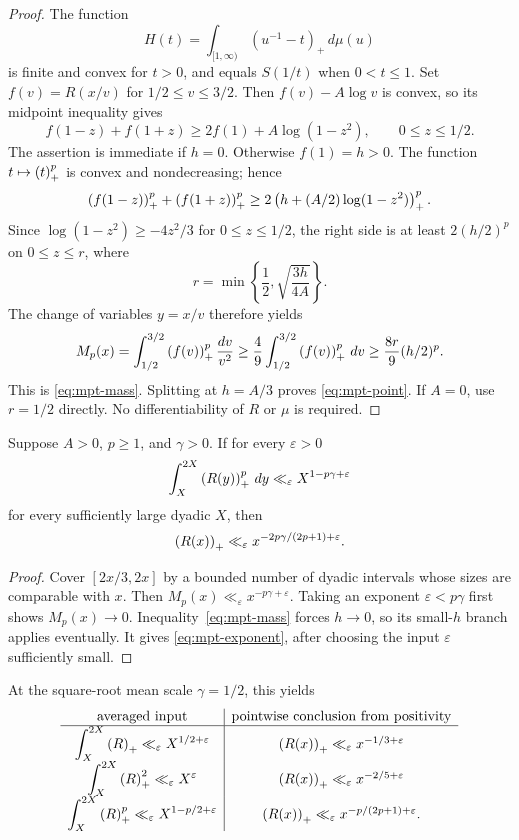 \begin{proof}
The function
\[
 H(t)=\int_{[1,\infty)}(u^{-1}-t)_+\,d\mu(u)
\]
is finite and convex for $t>0$, and equals $S(1/t)$ when
$0<t\le1$. Set $f(v)=R(x/v)$ for
$1/2\le v\le3/2$. Then $f(v)-A\log v$ is convex, so its
midpoint inequality gives
\begin{equation}\label{eq:mpt-midpoint}
 f(1-z)+f(1+z)\ge2f(1)+A\log(1-z^2),
 \qquad 0\le z\le1/2.
\end{equation}
The assertion is immediate if $h=0$. Otherwise $f(1)=h>0$.
The function $t\mapsto\left(t\right)_{+}^p$ is convex and nondecreasing; hence
\[
 \left(f(1-z)\right)_{+}^p+\left(f(1+z)\right)_{+}^p
 \ge2\left(h+(A/2)\log(1-z^2)\right)_{+}^p.
\]
Since $\log(1-z^2)\ge-4z^2/3$ for $0\le z\le1/2$, the right
side is at least $2(h/2)^p$ on $0\le z\le r$, where
\[
 r=\min\left\{\frac12,\sqrt{\frac{3h}{4A}}\right\}.
\]
The change of variables $y=x/v$ therefore yields
\[
 M_p(x)=\int_{1/2}^{3/2}\left(f(v)\right)_{+}^p\frac{dv}{v^2}
 \ge\frac49\int_{1/2}^{3/2}\left(f(v)\right)_{+}^p\,dv
 \ge\frac{8r}{9}(h/2)^p.
\]
This is \eqref{eq:mpt-mass}. Splitting at $h=A/3$ proves
\eqref{eq:mpt-point}. If $A=0$, use $r=1/2$ directly.
No differentiability of $R$ or $\mu$ is required.
\end{proof}

\begin{corollary}
\label{cor:mpt-exponent}
Suppose $A>0$, $p\ge1$, and $\gamma>0$. If for every $\varepsilon>0$
\begin{equation}\label{eq:mpt-dyadic}
 \int_X^{2X}\left(R(y)\right)_{+}^p\,dy
 \ll_\varepsilon X^{1-p\gamma+\varepsilon}
\end{equation}
for every sufficiently large dyadic $X$, then
\begin{equation}\label{eq:mpt-exponent}
 \left(R(x)\right)_{+}\ll_\varepsilon
 x^{-2p\gamma/(2p+1)+\varepsilon}.
\end{equation}
\end{corollary}

\begin{proof}
Cover $[2x/3,2x]$ by a bounded number of dyadic intervals whose sizes
are comparable with $x$. Then
$M_p(x)\ll_\varepsilon x^{-p\gamma+\varepsilon}$.
Taking an exponent $\varepsilon<p\gamma$ first shows $M_p(x)\to0$.
Inequality~\eqref{eq:mpt-mass} forces $h\to0$, so its small-$h$
branch applies eventually. It gives \eqref{eq:mpt-exponent}, after
choosing the input $\varepsilon$ sufficiently small.
\end{proof}

At the square-root mean scale $\gamma=1/2$, this yields
\[
\begin{array}{c|c}
\text{averaged input}&\text{pointwise conclusion from positivity}\\ \hline
\displaystyle\int_X^{2X}\left(R\right)_{+}\ll_\varepsilon X^{1/2+\varepsilon}
 &\left(R(x)\right)_{+}\ll_\varepsilon x^{-1/3+\varepsilon}\\[2mm]
\displaystyle\int_X^{2X}\left(R\right)_{+}^2\ll_\varepsilon X^\varepsilon
 &\left(R(x)\right)_{+}\ll_\varepsilon x^{-2/5+\varepsilon}\\[2mm]
\displaystyle\int_X^{2X}\left(R\right)_{+}^p\ll_\varepsilon X^{1-p/2+\varepsilon}
 &\left(R(x)\right)_{+}\ll_\varepsilon x^{-p/(2p+1)+\varepsilon}.
\end{array}
\]

